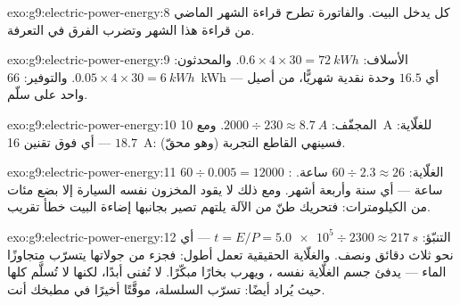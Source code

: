 \begin{solution}{exo:g9:electric-power-energy:8}
كل  يدخل البيت. والفاتورة تطرح قراءة الشهر
الماضي من قراءة هذا الشهر وتضرب الفرق في التعرفة.
\end{solution}

\begin{solution}{exo:g9:electric-power-energy:9}
الأسلاف: $0.6 \times 4 \times 30 = \qty{72}{kWh}$. والمحدثون:
$0.05 \times 4 \times 30 = \qty{6}{kWh}$. والتوفير:
\qty{66}{kWh} --- أي $16.5$ وحدة نقدية شهريًّا، من أصيل واحد
على سلّم.
\end{solution}

\begin{solution}{exo:g9:electric-power-energy:10}
المجفّف: $2000 \div 230 \approx \qty{8.7}{A}$. ومع
\qty{10}{A} للغلّاية: $18.7$ --- أي فوق تقنين 
\qty{16}{A}: فسينهي القاطع التجربة (وهو محقّ).
\end{solution}

\begin{solution}{exo:g9:electric-power-energy:11}
الغلّاية: $60 \div 2.3 \approx 26$ ساعة. :
$60 \div 0.005 = 12000$ ساعة --- أي سنة وأربعة أشهر. ومع ذلك
لا يقود المخزون نفسه السيارة إلا بضع مئات من الكيلومترات:
فتحريك طنّ من الآلة يلتهم  تصير بجانبها إضاءة البيت خطأ
تقريب.
\end{solution}

\begin{solution}{exo:g9:electric-power-energy:12}
التنبّؤ: $t = E/P = \num{5.0e5} \div 2300 \approx
\qty{217}{s}$ --- أي نحو ثلاث دقائق ونصف. والغلّاية الحقيقية
تعمل أطول: فجزء من جولاتها يتسرّب متجاوزًا الماء --- يدفئ جسم
الغلّاية نفسه ، ويهرب بخارًا مبكّرًا.  لا تُفنى
أبدًا، لكنها لا تُسلَّم كلها حيث يُراد أيضًا: تسرّب السلسلة،
موقَّتًا أخيرًا في مطبخك أنت.
\end{solution}

